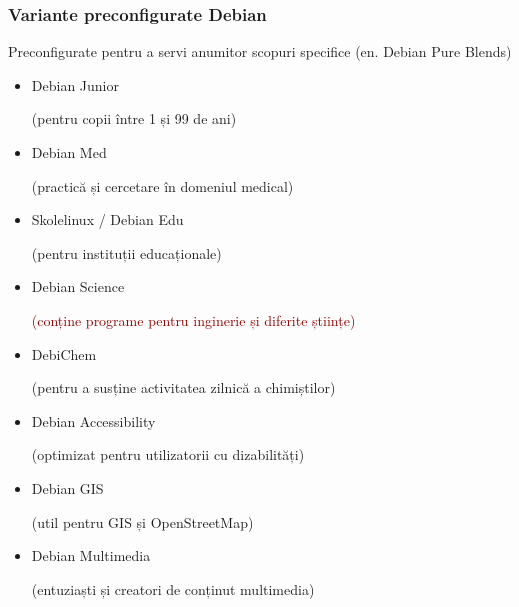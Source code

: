\documentclass[xcolor=dvipsnames]{beamer}
\begin{document}
\begin{frame}
\frametitle{Variante preconfigurate Debian}
\begin{block}
{Preconfigurate pentru a servi anumitor scopuri specifice}
(en. Debian Pure Blends)\\
\begin{itemize}
\item Debian Junior
	\begin{footnotesize}
		(pentru copii între 1 și 99 de ani)
	\end{footnotesize} 
\item Debian Med
	\begin{footnotesize}
		(practică și cercetare în domeniul medical)
	\end{footnotesize} 
\item Skolelinux / Debian Edu
	\begin{footnotesize}
		(pentru instituții educaționale)
	\end{footnotesize} 
\item Debian Science
	\begin{footnotesize}
		\textcolor{darkred}{(conține programe pentru inginerie și diferite științe)}
	\end{footnotesize} 
\item \textcolor{fade}{DebiChem}
	\begin{footnotesize}
		\textcolor{fade}{(pentru a susține activitatea zilnică a chimiștilor)}
	\end{footnotesize} 
\item \textcolor{fade}{Debian Accessibility}
	\begin{footnotesize}
		\textcolor{fade}{(optimizat pentru utilizatorii cu dizabilități)}
	\end{footnotesize} 
\item \textcolor{fade}{Debian GIS}
	\begin{footnotesize}
		\textcolor{fade}{(util pentru GIS și OpenStreetMap)}
	\end{footnotesize} 
\item \textcolor{fade}{Debian Multimedia}
	\begin{footnotesize}
		\textcolor{fade}{(entuziaști și creatori de conținut multimedia)}
	\end{footnotesize} 
\end{itemize}
\end{block}
\end{frame}
\end{document}
